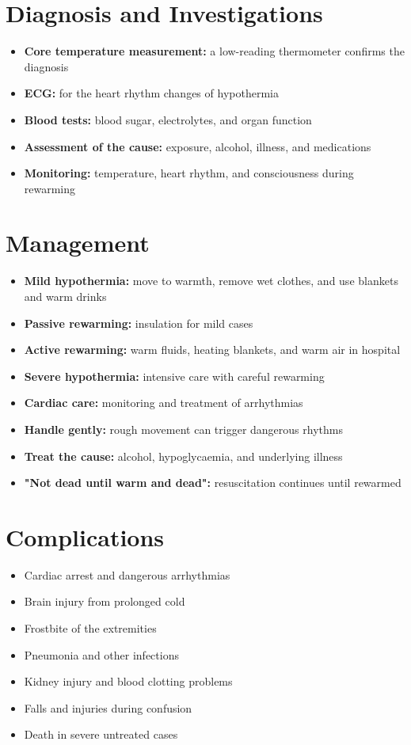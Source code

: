 \section*{Diagnosis and Investigations}
\begin{itemize}
    \item \textbf{Core temperature measurement:} a low-reading thermometer confirms the diagnosis
    \item \textbf{ECG:} for the heart rhythm changes of hypothermia
    \item \textbf{Blood tests:} blood sugar, electrolytes, and organ function
    \item \textbf{Assessment of the cause:} exposure, alcohol, illness, and medications
    \item \textbf{Monitoring:} temperature, heart rhythm, and consciousness during rewarming
\end{itemize}

\section*{Management}
\begin{itemize}
    \item \textbf{Mild hypothermia:} move to warmth, remove wet clothes, and use blankets and warm drinks
    \item \textbf{Passive rewarming:} insulation for mild cases
    \item \textbf{Active rewarming:} warm fluids, heating blankets, and warm air in hospital
    \item \textbf{Severe hypothermia:} intensive care with careful rewarming
    \item \textbf{Cardiac care:} monitoring and treatment of arrhythmias
    \item \textbf{Handle gently:} rough movement can trigger dangerous rhythms
    \item \textbf{Treat the cause:} alcohol, hypoglycaemia, and underlying illness
    \item \textbf{"Not dead until warm and dead":} resuscitation continues until rewarmed
\end{itemize}

\section*{Complications}
\begin{itemize}
    \item Cardiac arrest and dangerous arrhythmias
    \item Brain injury from prolonged cold
    \item Frostbite of the extremities
    \item Pneumonia and other infections
    \item Kidney injury and blood clotting problems
    \item Falls and injuries during confusion
    \item Death in severe untreated cases
\end{itemize}


